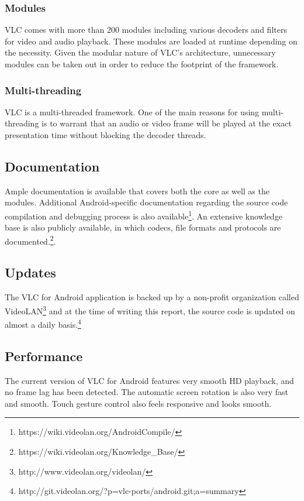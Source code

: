 \subsubsection{Modules}
VLC comes with more than 200 modules including various decoders and filters for video and audio playback. These modules are loaded at runtime depending on the necessity. Given the modular nature of VLC's architecture, unnecessary modules can be taken out in order to reduce the footprint of the framework.
\subsubsection{Multi-threading}
VLC is a multi-threaded framework. One of the main reasons for using multi-threading is to warrant that an audio or video frame will be played at the exact presentation time without blocking the decoder threads.
\subsection{Documentation}
Ample documentation is available that covers both the core as well as the modules. Additional Android-specific documentation regarding the source code compilation and debugging process is also available\footnote{https://wiki.videolan.org/AndroidCompile/}. An extensive knowledge base is also publicly available, in which codecs, file formats and protocols are documented.\footnote{https://wiki.videolan.org/Knowledge\_Base/}.
\subsection{Updates}
The VLC for Android application is backed up by a non-profit organization called VideoLAN\footnote{http://www.videolan.org/videolan/} and at the time of writing this report, the source code is updated on almost a daily basis.\footnote{http://git.videolan.org/?p=vlc-ports/android.git;a=summary}
\subsection{Performance}
The current version of VLC for Android features very smooth HD playback, and no frame lag has been detected. The automatic screen rotation is also very fast and smooth. Touch gesture control also feels responsive and looks smooth. 


